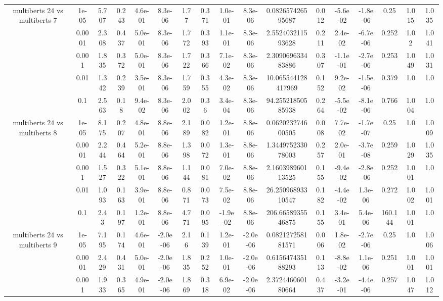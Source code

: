 \begin{tabular}{|c|c|c|c|c|c|c|c|c|c|c|c|c|c|c|c|c|}
\hline
\multirow{5}{*}{multiberts 24 vs multiberts 7} & 1e-05 & 5.707 & 0.243 & 4.6e-01 & 8.3e-06 & 1.77 & 0.371 & 1.0e-01 & 8.3e-06 & 0.082657426595687 & 0.012 & -5.6e-02 & -1.8e-06 & 0.25 & 1.015 & 1.035 \\
 & 0.0001 & 2.308 & 0.437 & 5.0e-01 & 8.3e-06 & 1.772 & 0.393 & 1.1e-01 & 8.3e-06 & 2.552403211593628 & 0.211 & 2.4e-02 & -6.7e-06 & 0.252 & 1.02 & 1.041 \\
 & 0.001 & 1.835 & 0.372 & 5.0e-01 & 8.3e-06 & 1.722 & 0.366 & 7.1e-02 & 8.3e-06 & 2.309069633483886 & 0.307 & -1.1e-01 & -2.7e-06 & 0.253 & 1.049 & 1.031 \\
 & 0.01 & 1.342 & 0.239 & 3.5e-01 & 8.3e-06 & 1.759 & 0.355 & 4.3e-02 & 8.3e-06 & 10.065544128417969 & 0.152 & 9.2e-02 & -1.5e-06 & 0.379 & 1.0 & 1.0 \\
 & 0.1 & 2.563 & 0.18 & 9.4e-02 & 8.3e-06 & 2.002 & 0.36 & 3.4e-04 & 8.3e-06 & 94.25521850585938 & 0.264 & -5.5e-02 & -8.1e-06 & 0.766 & 1.004 & 1.0 \\
\hline
\multirow{5}{*}{multiberts 24 vs multiberts 8} & 1e-05 & 8.175 & 0.207 & 4.8e-01 & 8.8e-06 & 2.189 & 0.082 & 1.2e-01 & 8.8e-06 & 0.062023274600505 & 0.008 & 7.7e-02 & -1.7e-07 & 0.25 & 1.0 & 1.009 \\
 & 0.0001 & 2.244 & 0.464 & 5.2e-01 & 8.8e-06 & 1.398 & 0.072 & 1.3e-01 & 8.8e-06 & 1.344975233078003 & 0.257 & 2.0e-01 & -3.7e-08 & 0.259 & 1.029 & 1.035 \\
 & 0.001 & 1.527 & 0.322 & 5.1e-01 & 8.8e-06 & 1.144 & 0.081 & 7.0e-02 & 8.8e-06 & 2.160398960113525 & 0.155 & -9.4e-02 & -2.8e-06 & 0.252 & 1.001 & 1.0 \\
 & 0.01 & 1.093 & 0.163 & 3.9e-01 & 8.8e-06 & 0.871 & 0.073 & 7.5e-02 & 8.8e-06 & 26.25096893310547 & 0.182 & -4.4e-02 & 1.3e-06 & 0.272 & 1.002 & 1.001 \\
 & 0.1 & 2.43 & 0.197 & 1.2e-01 & 8.8e-06 & 4.771 & 0.095 & -1.9e-02 & 8.8e-06 & 206.6658935546875 & 0.155 & 3.4e-01 & 5.4e-06 & 160.144 & 1.001 & 1.0 \\
\hline
\multirow{5}{*}{multiberts 24 vs multiberts 9} & 1e-05 & 7.195 & 0.174 & 4.6e-01 & -2.0e-06 & 2.16 & 0.139 & 1.2e-01 & -2.0e-06 & 0.082127258181571 & 0.006 & 1.8e-02 & -2.7e-06 & 0.25 & 1.0 & 1.006 \\
 & 0.0001 & 2.429 & 0.431 & 5.0e-01 & -2.0e-06 & 1.835 & 0.252 & 1.0e-01 & -2.0e-06 & 0.615647435188293 & 0.113 & -8.8e-02 & 1.1e-06 & 0.251 & 1.001 & 1.001 \\
 & 0.001 & 1.933 & 0.365 & 4.9e-01 & -2.0e-06 & 1.869 & 0.318 & 6.9e-02 & -2.0e-06 & 2.372446060180664 & 0.437 & -3.2e-01 & -4.4e-06 & 0.257 & 1.047 & 1.012 \\

\end{tabular}

